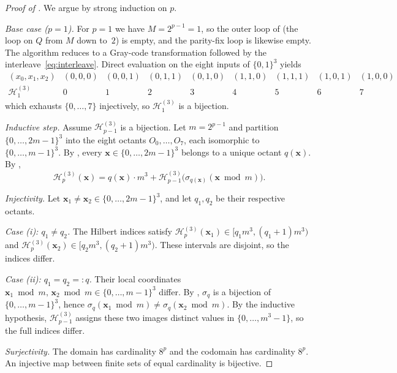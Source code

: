 \documentclass[11pt,a4paper]{article}
\theoremstyle{plain}
\theoremstyle{definition}
\theoremstyle{remark}
\newcommand{\Hil}{\mathcal{H}}
\begin{document}
\begin{proof}[Proof of ]
We argue by strong induction on $p$.

\emph{Base case ($p=1$).} For $p=1$ we have $M = 2^{p-1} = 1$, so the
outer loop of  (the loop on $Q$ from $M$ down
to~$2$) is empty, and the parity-fix loop is likewise empty. The
algorithm reduces to a Gray-code transformation followed by the
interleave~\eqref{eq:interleave}. Direct evaluation on the eight inputs
of $\{0,1\}^3$ yields
\begingroup
\small
\[
\begin{array}{c|cccccccc}
(x_0,x_1,x_2) &
(0,0,0) & (0,0,1) & (0,1,1) & (0,1,0) &
(1,1,0) & (1,1,1) & (1,0,1) & (1,0,0) \\
\Hil_1^{(3)} & 0 & 1 & 2 & 3 & 4 & 5 & 6 & 7
\end{array}
\]
\endgroup
which exhausts $\{0,\dots,7\}$ injectively, so $\Hil_1^{(3)}$ is a
bijection.

\emph{Inductive step.} Assume $\Hil_{p-1}^{(3)}$ is a bijection. Let
$m = 2^{p-1}$ and partition $\{0,\dots,2m-1\}^3$ into the eight
octants $O_0,\dots,O_7$, each isomorphic to $\{0,\dots,m-1\}^3$.
By , every $\mathbf{x}\in\{0,\dots,2m-1\}^3$ belongs
to a unique octant $q(\mathbf{x})$. By
,
\[
\Hil_p^{(3)}(\mathbf{x}) = q(\mathbf{x})\cdot m^3 +
\Hil_{p-1}^{(3)}\bigl(\sigma_{q(\mathbf{x})}(\mathbf{x}\bmod m)\bigr).
\]

\emph{Injectivity.} Let $\mathbf{x}_1\ne \mathbf{x}_2 \in
\{0,\dots,2m-1\}^3$, and let $q_1,q_2$ be their respective octants.

\emph{Case (i): $q_1\ne q_2$.} The Hilbert indices satisfy
$\Hil_p^{(3)}(\mathbf{x}_1)\in [q_1 m^3,(q_1+1)m^3)$ and
$\Hil_p^{(3)}(\mathbf{x}_2)\in [q_2 m^3,(q_2+1)m^3)$. These intervals
are disjoint, so the indices differ.

\emph{Case (ii): $q_1=q_2=:q$.} Their local coordinates
$\mathbf{x}_1\bmod m,\,\mathbf{x}_2\bmod m\in \{0,\dots,m-1\}^3$
differ. By , $\sigma_q$ is a bijection of
$\{0,\dots,m-1\}^3$, hence
$\sigma_q(\mathbf{x}_1\bmod m)\ne \sigma_q(\mathbf{x}_2\bmod m)$.
By the inductive hypothesis, $\Hil_{p-1}^{(3)}$ assigns these two
images distinct values in $\{0,\dots,m^3-1\}$, so the full indices
differ.

\emph{Surjectivity.} The domain has cardinality $8^p$ and the codomain
has cardinality $8^p$. An injective map between finite sets of equal
cardinality is bijective.
\end{proof}
\end{document}

